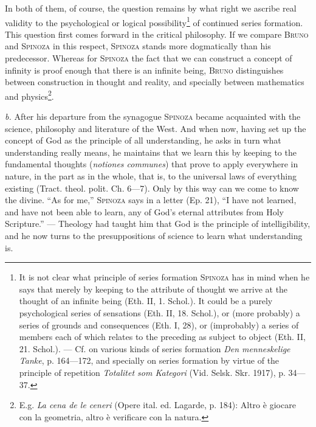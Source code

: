 \documentclass[12pt]{article}
\begin{document}
In both of them, of course, the question remains by what right we ascribe real
validity to the psychological or logical possibility\footnote{It is not clear
what principle of series formation \textsc{Spinoza} has in mind when he says that
merely by keeping to the attribute of thought we arrive at the thought of an
infinite being (Eth. II, 1. Schol.). It could be a purely psychological series of
sensations (Eth. II, 18. Schol.), or (more probably) a series of grounds and
consequences (Eth. I, 28), or (improbably) a series of members each of which
relates to the preceding as subject to object (Eth. II, 21. Schol.). --- Cf. on
various kinds of series formation \textit{Den menneskelige Tanke}, p. 164---172,
and specially on series formation by virtue of the principle of repetition
\textit{Totalitet som Kategori} (Vid. Selsk. Skr. 1917), p. 34---37.} of continued
series formation. This question first comes forward in the critical philosophy.
If we compare \textsc{Bruno} and \textsc{Spinoza} in this respect, \textsc{Spinoza}
stands more dogmatically than his predecessor. Whereas for \textsc{Spinoza} the fact
that we can construct a concept of infinity is proof enough that there is an
infinite being, \textsc{Bruno} distinguishes between construction in thought and
reality, and specially between mathematics and physics\footnote{E.g. \textit{La
cena de le ceneri} (Opere ital. ed. Lagarde, p. 184): Altro è giocare con la
geometria, altro è verificare con la natura.}.

\textit{b.} After his departure from the synagogue \textsc{Spinoza} became
acquainted with the science, philosophy and literature of the West. And when now,
having set up the concept of God as the principle of all understanding, he asks in
turn what understanding really means, he maintains that we learn this by keeping
to the fundamental thoughts (\textit{notiones communes}) that prove to apply
everywhere in nature, in the part as in the whole, that is, to the universal laws
of everything existing (Tract. theol. polit. Ch. 6---7). Only by this way can we
come to know the divine. ``As for me,'' \textsc{Spinoza} says in a letter (Ep. 21),
``I have not learned, and have not been able to learn, any of God's eternal
attributes from Holy Scripture.'' --- Theology had taught him that God is the
principle of intelligibility, and he now turns to the presuppositions of science
to learn what understanding is.
\end{document}
